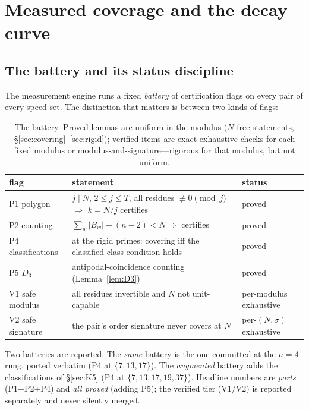 
\section{Measured coverage and the decay curve}\label{sec:measure}

\subsection{The battery and its status discipline}

The measurement engine runs a fixed \emph{battery} of certification
flags on every pair of every speed set. The distinction that matters is
between two kinds of flags:

\begin{table}[htbp]
\centering
\small
\caption{The battery. Proved lemmas are uniform in the modulus
($N$-free statements, \S\ref{sec:covering}--\ref{sec:rigid}); verified
items are exact exhaustive checks for each fixed modulus or
modulus-and-signature---rigorous for that modulus, but not uniform.}
\label{tab:battery}
\begin{tabularx}{\textwidth}{l X l}
\toprule
flag & statement & status \\
\midrule
P1 polygon & $j\mid N$, $2\le j\le T$, all residues $\not\equiv0 \pmod j$
  $\Rightarrow$ $k=N/j$ certifies & proved \\
P2 counting & $\sum_w|B_w|-(n-2)<N\Rightarrow$ certifies & proved \\
P4 classifications & at the rigid primes: covering iff the classified
  class condition holds & proved \\
P5 $D_3$ & antipodal-coincidence counting
  (Lemma~\ref{lem:D3}) & proved \\
V1 safe modulus & all residues invertible and $N$ not unit-capable &
  per-modulus exhaustive \\
V2 safe signature & the pair's order signature never covers at $N$ &
  per-$(N,\sigma)$ exhaustive \\
\bottomrule
\end{tabularx}
\end{table}

Two batteries are reported. The \emph{same} battery is the one committed
at the $n=4$ rung, ported verbatim (P4 at $\{7,13,17\}$). The
\emph{augmented} battery adds the classifications of
\S\ref{sec:K5} (P4 at $\{7,13,17,19,37\}$). Headline numbers are
\emph{ports} (P1$+$P2$+$P4) and \emph{all proved} (adding P5); the
verified tier (V1/V2) is reported separately and never silently merged.

